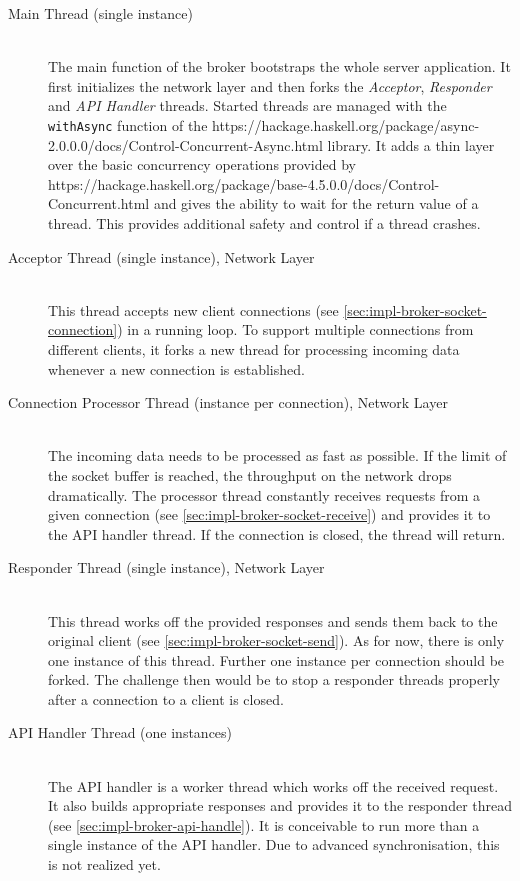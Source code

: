 \begin{description}
\item [Main Thread (single instance)] \hfill \\
    The main function of the broker bootstraps the whole server application. It first
    initializes the network layer and then forks the \textit{Acceptor}, \textit{Responder} and \textit{API Handler}
    threads. Started threads are managed with the \lstinline{withAsync} function of
    the 
    {https://hackage.haskell.org/package/async-2.0.0.0/docs/Control-Concurrent-Async.html}
    library. It adds a thin layer over the basic concurrency operations provided
    by 
    {https://hackage.haskell.org/package/base-4.5.0.0/docs/Control-Concurrent.html}
    and gives the ability to wait for the return value of a thread. This
    provides additional safety and control if a thread crashes. 

\item[Acceptor Thread (single instance), Network Layer] \hfill \\
    This thread accepts new client connections (see
    \ref{sec:impl-broker-socket-connection}) in a running loop. To support
    multiple connections from different clients, it forks a new thread for
    processing incoming data whenever a new connection is established. 

\item[Connection Processor Thread (instance per connection), Network Layer] \hfill \\
    The incoming data needs to be processed as fast as possible. If the
    limit of the socket buffer is reached, the throughput on the network drops
    dramatically. The processor thread constantly receives requests from a
    given connection (see \ref{sec:impl-broker-socket-receive}) and provides it
    to the API handler thread. If the connection is closed, the thread will
    return. 
\item[Responder Thread (single instance), Network Layer] \hfill \\
    This thread works off the provided responses and sends them back to the original
    client (see \ref{sec:impl-broker-socket-send}). As for now, there is only
    one instance of this thread. Further one instance per connection should be
    forked. The challenge then would be to stop a responder threads properly after
    a connection to a client is closed.  
\item [API Handler Thread (one instances)] \hfill   \\
    The API handler is a worker thread which works off the received request. It
    also builds appropriate responses and provides it to the responder thread
    (see \ref{sec:impl-broker-api-handle}). It is conceivable to run more than
    a single instance of the API handler. Due to advanced synchronisation, this
    is not realized yet.
\end{description}

